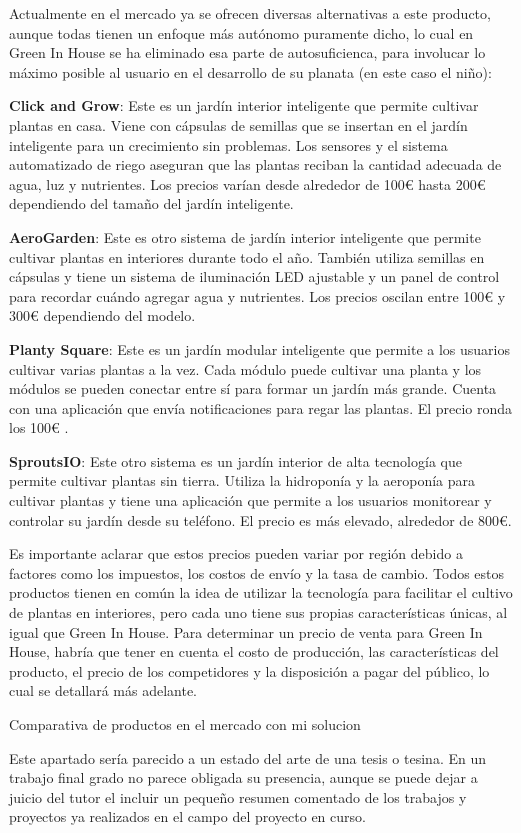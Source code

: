 
Actualmente en el mercado ya se ofrecen diversas alternativas a este producto, aunque todas tienen un enfoque más autónomo puramente dicho, lo cual en Green In House se ha eliminado esa parte de autosuficienca, para involucar lo máximo posible al usuario  en el desarrollo de su planata (en este caso el niño):

\textbf{Click and Grow}: Este es un jardín interior inteligente que permite cultivar plantas en casa. Viene con cápsulas de semillas que se insertan en el jardín inteligente para un crecimiento sin problemas. Los sensores y el sistema automatizado de riego aseguran que las plantas reciban la cantidad adecuada de agua, luz y nutrientes. Los precios varían desde alrededor de 100€ hasta 200€ dependiendo del tamaño del jardín inteligente.

\textbf{AeroGarden}: Este es otro sistema de jardín interior inteligente que permite cultivar plantas en interiores durante todo el año. También utiliza semillas en cápsulas y tiene un sistema de iluminación LED ajustable y un panel de control para recordar cuándo agregar agua y nutrientes. Los precios oscilan entre 100€ y 300€ dependiendo del modelo.

\textbf{Planty Square}: Este es un jardín modular inteligente que permite a los usuarios cultivar varias plantas a la vez. Cada módulo puede cultivar una planta y los módulos se pueden conectar entre sí para formar un jardín más grande. Cuenta con una aplicación que envía notificaciones para regar las plantas. El precio ronda los 100€ .

\textbf{SproutsIO}: Este otro sistema es un jardín interior de alta tecnología que permite cultivar plantas sin tierra. Utiliza la hidroponía y la aeroponía para cultivar plantas y tiene una aplicación que permite a los usuarios monitorear y controlar su jardín desde su teléfono. El precio es más elevado, alrededor de 800€.

Es importante aclarar que estos precios pueden variar por región debido a factores como los impuestos, los costos de envío y la tasa de cambio. Todos estos productos tienen en común la idea de utilizar la tecnología para facilitar el cultivo de plantas en interiores, pero cada uno tiene sus propias características únicas, al igual que Green In House. Para determinar un precio de venta para Green In House, habría que tener en cuenta el costo de producción, las características del producto, el precio de los competidores y la disposición a pagar del público, lo cual se detallará más adelante.





Comparativa de productos en el mercado con mi solucion

Este apartado sería parecido a un estado del arte de una tesis o tesina. En un trabajo final grado no parece obligada su presencia, aunque se puede dejar a juicio del tutor el incluir un pequeño resumen comentado de los trabajos y proyectos ya realizados en el campo del proyecto en curso. 
